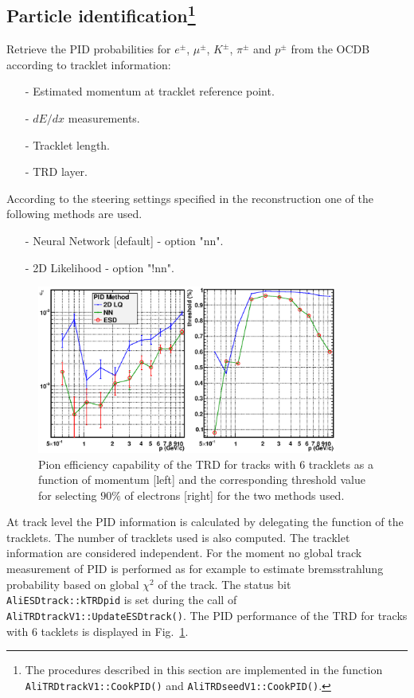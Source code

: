 \documentclass{alicetdr}
\begin{document}
\subsection[Tracklet PID]{Particle identification\footnote{The procedures described
in this section are implemented in the function {\tt AliTRDtrackV1::CookPID()} and
{\tt AliTRDseedV1::CookPID()}.}}\label{REC:Tracking:TrackletPID}

Retrieve the PID probabilities for $e^\pm$, $\mu^\pm$, $K^\pm$, $\pi^\pm$ and $p^\pm$
from the OCDB according to tracklet information:
\begin{itemize}
\item[-] Estimated momentum at tracklet reference point.
\item[-] $dE/dx$ measurements.
\item[-] Tracklet length.
\item[-] TRD layer.
\end{itemize}
According to the steering settings specified in the reconstruction one of the
following methods are used.
\begin{itemize}
\item[-] Neural Network [default] - option "nn".
\item[-] 2D Likelihood - option "!nn".
\end{itemize}
\begin{figure}[htb]
\begin{center}
\includegraphics[width=0.88\textwidth, height=0.45\textwidth]{plots/trackPID.eps}
\end{center}
\caption{
Pion efficiency capability of the TRD for tracks with 6 tracklets as a function of
momentum [left] and the corresponding threshold value for selecting $90\%$ of
electrons [right] for the two methods used.}
\label{FIG_TRACK:PID}
\end{figure}

At track level the PID information is calculated by delegating the function of
the tracklets. The number of tracklets used is also computed. The tracklet
information are considered independent. For the moment no global track measurement
of PID is performed as for example to estimate bremsstrahlung probability based on
global $\chi^2$ of the track. The status bit {\tt AliESDtrack::kTRDpid} is set
during the call of {\tt AliTRDtrackV1::UpdateESDtrack()}. The PID performance of
the TRD for tracks with 6 tacklets is displayed in Fig.~\ref{FIG_TRACK:PID}.
\\
\end{document}
